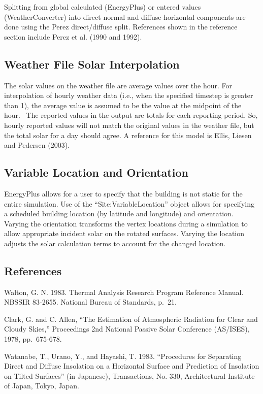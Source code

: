 Splitting from global calculated (EnergyPlus) or entered values (WeatherConverter) into direct normal and diffuse horizontal components are done using the Perez direct/diffuse split. References shown in the reference section include Perez et al. (1990 and 1992).

\subsection{Weather File Solar Interpolation}\label{weather-file-solar-interpolation}

The solar values on the weather file are average values over the hour. For interpolation of hourly weather data (i.e., when the specified timestep is greater than 1), the average value is assumed to be the value at the midpoint of the hour.~ The reported values in the output are totals for each reporting period. So, hourly reported values will not match the original values in the weather file, but the total solar for a day should agree. A reference for this model is Ellis, Liesen and Pedersen (2003).

\subsection{Variable Location and Orientation}\label{variable-location-orientation}

EnergyPlus allows for a user to specify that the building is not static for the entire simulation.
Use of the ``Site:VariableLocation'' object allows for specifying a scheduled building location (by latitude and longitude) and orientation.
Varying the orientation transforms the vertex locations during a simulation to allow appropriate incident solar on the rotated surfaces.
Varying the location adjusts the solar calculation terms to account for the changed location.

\subsection{References}\label{references-010}

Walton, G. N. 1983. Thermal Analysis Research Program Reference Manual. NBSSIR 83-2655. National Bureau of Standards, p.~21.

Clark, G. and C. Allen, ``The Estimation of Atmospheric Radiation for Clear and Cloudy Skies,'' Proceedings 2nd National Passive Solar Conference (AS/ISES), 1978, pp.~675-678.

Watanabe, T., Urano, Y., and Hayashi, T. 1983. ``Procedures for Separating Direct and Diffuse Insolation on a Horizontal Surface and Prediction of Insolation on Tilted Surfaces'' (in Japanese), Transactions, No. 330, Architectural Institute of Japan, Tokyo, Japan.

